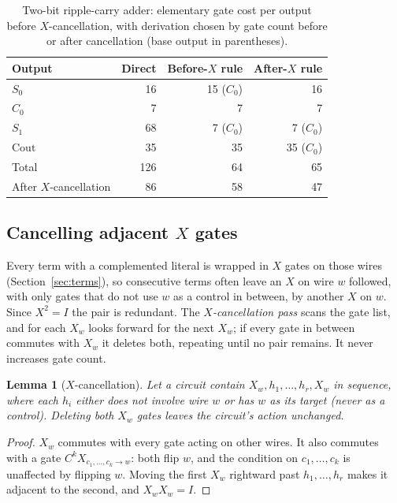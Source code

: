 \documentclass[conference]{IEEEtran}
\theoremstyle{plain}
\newtheorem{lemma}{Lemma}
\begin{document}
\begin{table}[t]
\centering
\caption{Two-bit ripple-carry adder: elementary gate cost per output before $X$-cancellation, with derivation chosen by gate count before or after cancellation (base output in parentheses).}
\label{tab:adder2}
\begin{tabular}{@{}lrrr@{}}
\toprule
Output & Direct & Before-$X$ rule & After-$X$ rule\\
\midrule
$S_0$ & 16 & 15 ($C_0$) & 16\\
$C_0$ & 7 & 7 & 7\\
$S_1$ & 68 & 7 ($C_0$) & 7 ($C_0$)\\
$\mathrm{Cout}$ & 35 & 35 & 35 ($C_0$)\\
\midrule
Total & 126 & 64 & 65\\
After $X$-cancellation & 86 & 58 & 47\\
\bottomrule
\end{tabular}
\end{table}

\subsection{Cancelling adjacent \texorpdfstring{$X$}{X} gates}
\label{sec:xcancel}
Every term with a complemented literal is wrapped in $X$ gates on those
wires (Section~\ref{sec:terms}), so consecutive terms often leave an $X$
on wire $w$ followed, with only gates that do not use $w$ as a control in
between, by another $X$ on $w$. Since $X^2=I$ the pair is redundant. The
\emph{$X$-cancellation pass} scans the gate list, and for each $X_w$ looks
forward for the next $X_w$; if every gate in between commutes with $X_w$
it deletes both, repeating until no pair remains. It never increases gate
count.

\begin{lemma}[$X$-cancellation]
\label{lem:xcancel}
Let a circuit contain $X_w, h_1,\dots,h_r, X_w$ in sequence, where each
$h_i$ either does not involve wire $w$ or has $w$ as its \emph{target}
(never as a control). Deleting both $X_w$ gates leaves the circuit's action
unchanged.
\end{lemma}
\begin{proof}
$X_w$ commutes with every gate acting on other wires. It also commutes
with a gate $C^kX_{c_1,\dots,c_k\to w}$: both flip $w$, and the condition
on $c_1,\dots,c_k$ is unaffected by flipping $w$. Moving the first $X_w$
rightward past $h_1,\dots,h_r$ makes it adjacent to the second, and
$X_wX_w=I$.
\end{proof}
\end{document}
